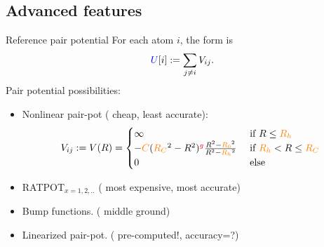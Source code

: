\documentclass{beamer}
\begin{document}
\subsection{Advanced features}
\begin{frame}{Reference pair potential}
    For each atom $i$, the form is
    \begin{equation}
        {\color{blue}U}[i] := \sum_{j \neq i}V_{ij}.
    \end{equation}
    Pair potential possibilities:
    \begin{itemize}
        \item Nonlinear pair-pot ({\color{blue} cheap, least accurate}):
        \begin{equation}
            V_{ij} := V(R) = 
            \begin{cases}
                \infty & \text{ if }R \leq {\color{orange}R_h} \\
                -{\color{orange}C}({\color{orange}R_C}^2 - R^2)^{\color{red}g}\frac{R^2 - {\color{orange}R_0}^2}{R^2 - {\color{orange}R_h}^2} & \text{ if } {\color{orange}R_h} < R \leq {\color{orange}R_C} \\
                0 & \text{ else}
            \end{cases}
        \end{equation}
        \item RATPOT$_{x=1,2,..}$ ({\color{blue} most expensive, most accurate})
        \item Bump functions. ({\color{blue} middle ground})
        \item Linearized pair-pot. (\color{blue} pre-computed!, accuracy=?)
    \end{itemize}
\end{frame}
\end{document}
